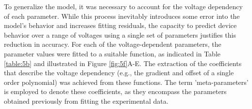 
\noindent To generalize the model, it was necessary to account for the voltage dependency of each parameter. While this process inevitably introduces some error into the model's behavior and increases fitting residuals, the capacity to predict device behavior over a range of voltages using a single set of parameters justifies this reduction in accuracy. For each of the voltage-dependent parameters, the parameter values were fitted to a suitable function, as indicated in Table \ref{table:5b} and illustrated in Figure \ref{fig:5f}A-E. The extraction of the coefficients that describe the voltage dependency (e.g., the gradient and offset of a single order polynomial) was achieved from these functions. The term 'meta-parameters' is employed to denote these coefficients, as they encompass the parameters obtained previously from fitting the experimental data.\\




